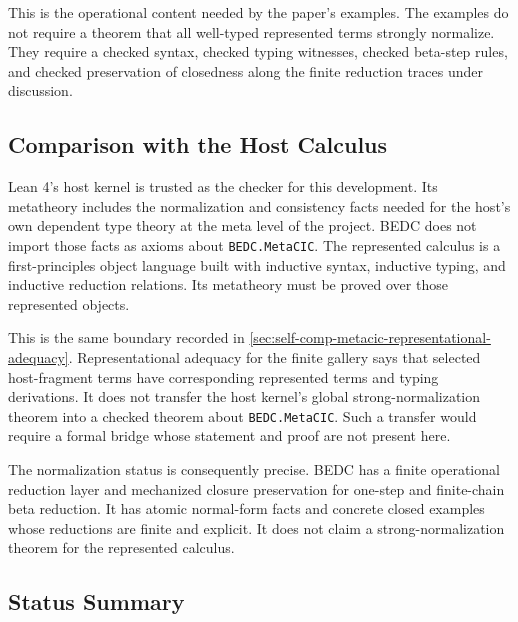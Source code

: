 This is the operational content needed by the paper's examples. The examples
do not require a theorem that all well-typed represented terms strongly
normalize. They require a checked syntax, checked typing witnesses, checked
beta-step rules, and checked preservation of closedness along the finite
reduction traces under discussion.

\subsection{Comparison with the Host Calculus}
\label{subsec:metacic-normalization-host-cic}

Lean 4's host kernel is trusted as the checker for this development. Its
metatheory includes the normalization and consistency facts needed for the
host's own dependent type theory at the meta level of the project. BEDC does
not import those facts as axioms about \texttt{BEDC.MetaCIC}. The represented
calculus is a first-principles object language built with inductive syntax,
inductive typing, and inductive reduction relations. Its metatheory must be
proved over those represented objects.

This is the same boundary recorded in
\autoref{sec:self-comp-metacic-representational-adequacy}. Representational
adequacy for the finite gallery says that selected host-fragment terms have
corresponding represented terms and typing derivations. It does not transfer
the host kernel's global strong-normalization theorem into a checked theorem
about \texttt{BEDC.MetaCIC}. Such a transfer would require a formal bridge
whose statement and proof are not present here.

The normalization status is consequently precise. BEDC has a finite
operational reduction layer and mechanized closure preservation for one-step
and finite-chain beta reduction. It has atomic normal-form facts and concrete
closed examples whose reductions are finite and explicit. It does not claim a
strong-normalization theorem for the represented calculus.

\subsection{Status Summary}
\label{subsec:metacic-normalization-status-summary}

